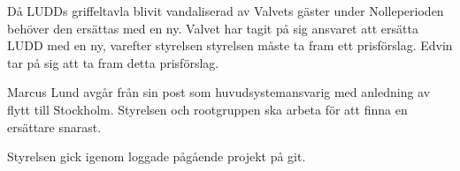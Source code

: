 \documentclass{protokoll}
\begin{document}
Då LUDDs griffeltavla blivit vandaliserad av Valvets gäster under Nolleperioden behöver den ersättas med en ny. Valvet har tagit på sig ansvaret att ersätta LUDD med en ny, varefter styrelsen styrelsen måste ta fram ett prisförslag. 
Edvin tar på sig att ta fram detta prisförslag. 

Marcus Lund avgår från sin post som huvudsystemansvarig med anledning av flytt till Stockholm. Styrelsen och rootgruppen ska arbeta för att finna en ersättare snarast. 

Styrelsen gick igenom loggade pågående projekt på git.
\end{document}
